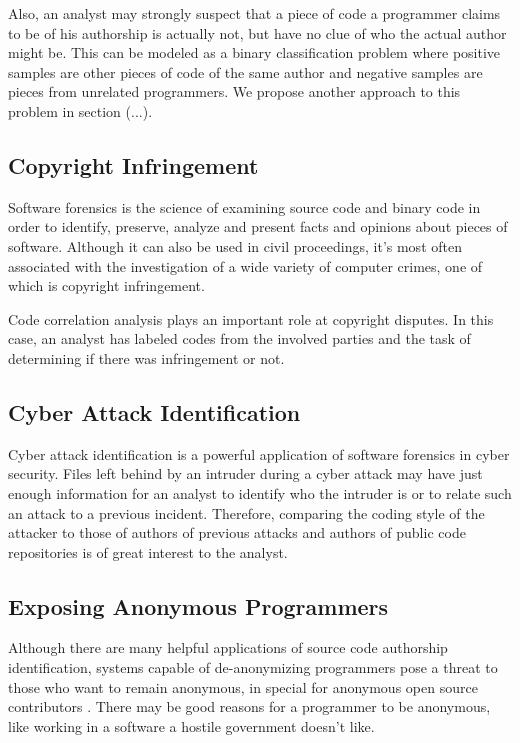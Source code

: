 Also, an analyst may strongly suspect that a piece of code a programmer claims to be of his authorship is actually not, but have no clue of who the actual author might be. This can be modeled as a binary classification problem where positive samples are other pieces of code of the same author and negative samples are pieces from unrelated programmers. We propose another approach to this problem in section (...). %

\subsection{Copyright Infringement}

Software forensics is the science of examining source code and binary code in order to identify, preserve, analyze and present facts and opinions about pieces of software. Although it can also be used in civil proceedings, it's most often associated with the investigation of a wide variety of computer crimes, one of which is copyright infringement.

Code correlation analysis plays an important role at copyright disputes. In this case, an analyst has labeled codes from the involved parties and the task of determining if there was infringement or not.

\subsection{Cyber Attack Identification}

Cyber attack identification is a powerful application of software forensics in cyber security. Files left behind by an intruder during a cyber attack may have just enough information for an analyst to identify who the intruder is or to relate such an attack to a previous incident. Therefore, comparing the coding style of the attacker to those of authors of previous attacks and authors of public code repositories is of great interest to the analyst.


\subsection{Exposing Anonymous Programmers}

Although there are many helpful applications of source code authorship identification, systems capable of de-anonymizing programmers pose a threat to those who want to remain anonymous, in special for anonymous open source contributors \cite{gitblame}. There may be good reasons for a programmer to be anonymous, like working in a software a hostile government doesn't like. 

